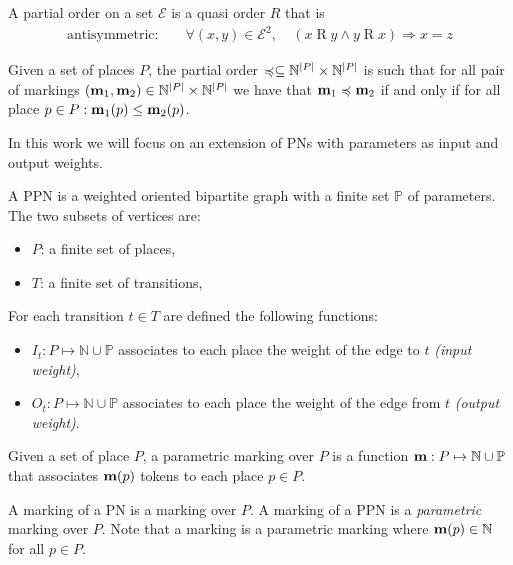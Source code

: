 \begin{defi}
  A partial order on a set $\mathcal{E}$ is a quasi order $R$ that is
  \begin{align*}
    \text{antisymmetric: } &&\forall (x, y) \in \mathcal{E}^2,\ & (x \mathrel{R} y\land y \mathrel{R} x)\Rightarrow x = z
  \end{align*}
\end{defi}

\begin{defi}
  Given a set of places $P$, the partial order \(\preccurlyeq \subseteq \mathbb{N}^{|P|} \times \mathbb{N}^{|P|}\) is such that for all pair of markings \((\mathbf{m}_1, \mathbf{m}_2) \in \mathbb{N}^{|P|} \times \mathbb{N}^{|P|}\) we have that \(\mathbf{m}_1 \preccurlyeq \mathbf{m}_2\) if and only if for all place \(p \in P : \mathbf{m}_1(p) \leq \mathbf{m}_2(p)\).
\end{defi}

In this work we will focus on an extension of \acp{PN} with parameters as input and output weights.

\begin{defi}
  A \acf{PPN} \SPTP is a weighted oriented bipartite graph with a finite set $\mathbb{P}$ of parameters. The two subsets of vertices are:
  \begin{itemize}
    \item $P$: a finite set of places,
    \item $T$: a finite set of transitions,
  \end{itemize}
  For each transition $t \in T$ are defined the following functions:
  \begin{itemize}
    \item $I_t : P \mapsto \mathbb{N} \cup \mathbb{P}$ associates to each place the weight of the edge to $t$ \emph{(input weight)},
    \item $O_t : P \mapsto \mathbb{N} \cup \mathbb{P}$ associates to each place the weight of the edge from $t$ \emph{(output weight)}.
  \end{itemize}
\end{defi}

\begin{defi}
  Given a set of place $P$, a parametric marking over $P$ is a function $\mathbf{m} : P \mapsto \mathbb{N} \cup \mathbb{P} $ that associates $\mathbf{m}(p)$ tokens to each place $p \in P$.
\end{defi}

A marking of a \ac{PN} \NPT is a marking over $P$.
A marking of a \ac{PPN} \SPTP is a \emph{parametric} marking over $P$.
Note that a marking \marq is a parametric marking where $\mathbf{m}(p) \in \mathbb{N}$ for all $p \in P$.


